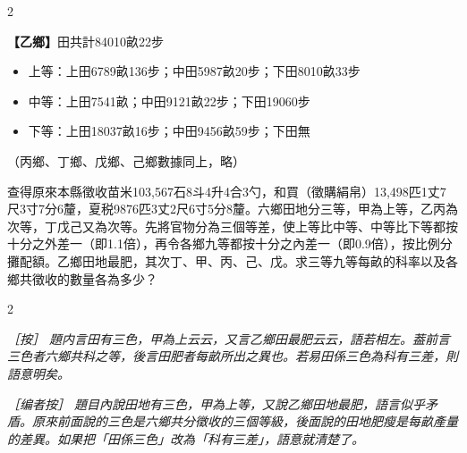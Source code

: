 \documentclass[11pt,a4paper]{article}
\newcommand{\ClassicalNote}[1]{\par\noindent\textit{［按］#1}\par}
\newcommand{\ModernNote}[1]{\par\noindent\textit{\color{notecolor}［编者按］#1}\par}
\begin{document}
\begin{paracol}{2}
{\textbf{【乙鄉】}田共計84010畝22步

\begin{itemize}[leftmargin=1.5em,topsep=0pt,itemsep=1pt]
\item 上等：上田6789畝136步；中田5987畝20步；下田8010畝33步
\item 中等：上田7541畝；中田9121畝22步；下田19060步
\item 下等：上田18037畝16步；中田9456畝59步；下田無
\end{itemize}

（丙鄉、丁鄉、戊鄉、己鄉數據同上，略）

查得原來本縣徵收苗米103,567石8斗4升4合3勺，和買（徵購絹帛）13,498匹1丈7尺3寸7分6釐，夏税9876匹3丈2尺6寸5分8釐。六鄉田地分三等，甲為上等，乙丙為次等，丁戊己又為次等。先將官物分為三個等差，使上等比中等、中等比下等都按十分之外差一（即1.1倍），再令各鄉九等都按十分之內差一（即0.9倍），按比例分攤配額。乙鄉田地最肥，其次丁、甲、丙、己、戊。求三等九等每畝的科率以及各鄉共徵收的數量各為多少？
}

\end{paracol}



\begin{paracol}{2}

\ClassicalNote{%
題内言田有三色，甲為上云云，又言乙鄉田最肥云云，語若相左。葢前言三色者六鄉共科之等，後言田肥者每畝所出之異也。若易田係三色為科有三差，則語意明矣。}

\switchcolumn

\ModernNote{%
題目內說田地有三色，甲為上等，又說乙鄉田地最肥，語言似乎矛盾。原來前面說的三色是六鄉共分徵收的三個等級，後面說的田地肥瘦是每畝產量的差異。如果把「田係三色」改為「科有三差」，語意就清楚了。}

\end{paracol}
\end{document}
